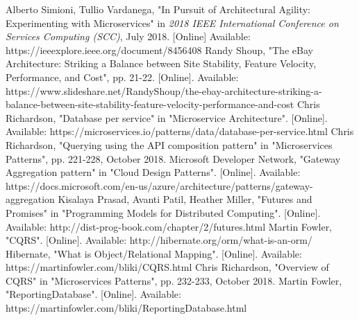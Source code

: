\documentclass[conference]{IEEEtran}
\begin{document}
%
%
%
\begin{thebibliography}{1}

Alberto Simioni, Tullio Vardanega, "In Pursuit of Architectural Agility: Experimenting with Microservices" in \textit{2018 IEEE International Conference on Services Computing (SCC)}, July 2018. [Online] Available: https://ieeexplore.ieee.org/document/8456408
Randy Shoup, "The eBay Architecture: Striking a Balance between Site Stability, Feature Velocity, Performance, and Cost", pp. 21-22. [Online]. Available: https://www.slideshare.net/RandyShoup/the-ebay-architecture-striking-a-balance-between-site-stability-feature-velocity-performance-and-cost
Chris Richardson, "Database per service" in "Microservice Architecture". [Online]. Available: https://microservices.io/patterns/data/database-per-service.html
Chris Richardson, "Querying using the API composition pattern" in "Microservices Patterns", pp. 221-228, October 2018.
Microsoft Developer Network, "Gateway Aggregation pattern" in "Cloud Design Patterns". [Online]. Available: https://docs.microsoft.com/en-us/azure/architecture/patterns/gateway-aggregation
Kisalaya Prasad, Avanti Patil, Heather Miller, "Futures and Promises" in "Programming Models for Distributed Computing". [Online]. Available: http://dist-prog-book.com/chapter/2/futures.html
Martin Fowler, "CQRS". [Online]. Available: http://hibernate.org/orm/what-is-an-orm/
Hibernate, "What is Object/Relational Mapping". [Online]. Available: https://martinfowler.com/bliki/CQRS.html
Chris Richardson, "Overview of CQRS" in "Microservices Patterns", pp. 232-233, October 2018.
Martin Fowler, "ReportingDatabase". [Online]. Available: https://martinfowler.com/bliki/ReportingDatabase.html

\end{thebibliography}
\end{document}
